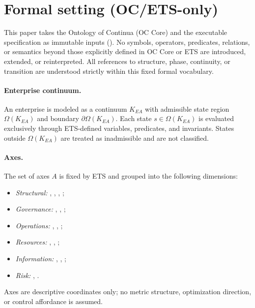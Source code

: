 ﻿\section{Formal setting (OC/ETS-only)}
\label{sec:formal}

This paper takes the Ontology of Continua (OC Core) and the executable
specification  as immutable inputs
(). No symbols, operators, predicates,
relations, or semantics beyond those explicitly defined in OC Core or ETS are
introduced, extended, or reinterpreted. All references to structure, phase,
continuity, or transition are understood strictly within this fixed formal
vocabulary.

\paragraph{Enterprise continuum.}
An enterprise is modeled as a continuum $K_{EA}$ with admissible state region
$\Omega(K_{EA})$ and boundary $\partial\Omega(K_{EA})$. Each state
$s \in \Omega(K_{EA})$ is evaluated exclusively through ETS-defined variables,
predicates, and invariants. States outside $\Omega(K_{EA})$ are treated as
inadmissible and are not classified.

\paragraph{Axes.}
The set of axes $A$ is fixed by ETS and grouped into the following dimensions:
\begin{itemize}
  \item \emph{Structural:} , ,
        , ;
  \item \emph{Governance:} ,
        , ;
  \item \emph{Operations:} ,
        , ;
  \item \emph{Resources:} ,
        , ;
  \item \emph{Information:} ,
        , ;
  \item \emph{Risk:} , .
\end{itemize}
Axes are descriptive coordinates only; no metric structure, optimization
direction, or control affordance is assumed.

